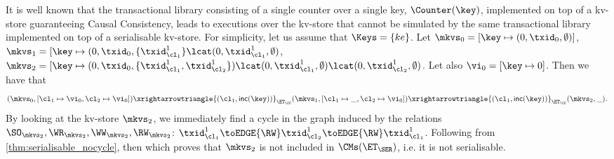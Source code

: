 It is well known that the transactional library consisting of a single counter over a single 
key, $\Counter(\key)$, implemented on top of a kv-store guaranteeing Causal Consistency, 
leads to executions over the kv-store that cannot be simulated by the same transactional 
library implemented on top of a serialisable kv-store. 
For simplicity, let us assume that $\Keys = \{ke\}$.
Let $\mkvs_{0} = [\key \mapsto (0, \txid_{0}, \emptyset)]$,  
$\mkvs_1 = [\key \mapsto (0, \txid_{0}, \{\txid_{\cl_1}^{1}\} \lcat (0, \txid_{\cl_1}^{1}, \emptyset)$, 
$\mkvs_2 = [\key \mapsto (0, \txid_{0}, \{\txid_{\cl_1}^{1}, \txid_{\cl_2}^{1}\}) \lcat (0, \txid_{\cl_1}^{1}, \emptyset) 
\lcat (0, \txid_{\cl_2}^{1}, \emptyset)$. Let also
$\vi_{0} = [\key \mapsto {0}]$. Then we have that 
\[
(\mkvs_{0}, [\cl_1 \mapsto \vi_0, \cl_2 \mapsto \vi_0]) \xrightarrowtriangle{(\cl_1, \mathsf{inc(\key)})}_{\ET_{\CC}} 
(\mkvs_1, [\cl_1 \mapsto \_, \cl_2 \mapsto \vi_0]) \xrightarrowtriangle{(\cl_1, \mathsf{inc(\key)})}_{\ET_{\CC}} 
(\mkvs_2, \_).
\]
By looking at the kv-store $\mkvs_{2}$, we immediately find a cycle in the graph induced by 
the relations $\SO_{\mkvs_{2}}, \WR_{\mkvs_{2}}, \WW_{\mkvs_{2}}, \RW_{\mkvs_{2}}$: 
$\txid_{\cl_1}^{1} \toEDGE{\RW} \txid_{\cl_2}^{1} \toEDGE{\RW} \txid_{\cl_1}^{1}$. 
Following from \cref{thm:serialisable_nocycle}, then 
which proves that $\mkvs_2$ is not included in $\CMs(\ET_{\SER})$, i.e. it is 
not serialisable.

